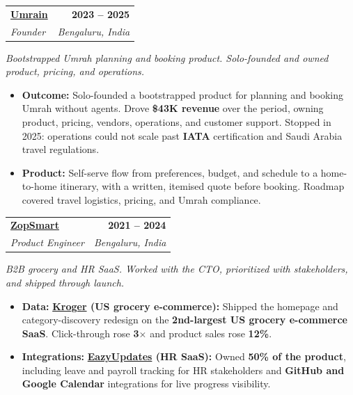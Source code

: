\documentclass[letterpaper,11pt]{article}
\makeatletter
\newcommand{\entry}[4]{%
  \begin{tabularx}{\linewidth}{@{}X@{}r@{}}
    \textbf{#1} & \textbf{#4} \\
    \textit{#2} & \textit{#3} \\
  \end{tabularx}%
  \vspace{1pt}
}
\makeatother
\begin{document}
\entry{\href{https://umrain.in}{Umrain}}{Founder}{Bengaluru, India}{2023 -- 2025}
{\small\textit{Bootstrapped Umrah planning and booking product. Solo-founded and owned product, pricing, and operations.}}
\begin{itemize}
  \item \textbf{Outcome:} Solo-founded a bootstrapped product for planning and booking Umrah without agents. Drove \textbf{\$43K revenue} over the period, owning product, pricing, vendors, operations, and customer support. Stopped in 2025: operations could not scale past \textbf{IATA} certification and Saudi Arabia travel regulations.
  \item \textbf{Product:} Self-serve flow from preferences, budget, and schedule to a home-to-home itinerary, with a written, itemised quote before booking. Roadmap covered travel logistics, pricing, and Umrah compliance.
\end{itemize}

\entry{\href{https://zopsmart.com}{ZopSmart}}{Product Engineer}{Bengaluru, India}{2021 -- 2024}
{\small\textit{B2B grocery and HR SaaS. Worked with the CTO, prioritized with stakeholders, and shipped through launch.}}
\begin{itemize}
  \item \textbf{Data:} \textbf{\href{https://www.kroger.com}{Kroger} (US grocery e-commerce):} Shipped the homepage and category-discovery redesign on the \textbf{2nd-largest US grocery e-commerce SaaS}. Click-through rose \textbf{3$\times$} and product sales rose \textbf{12\%}.
  \item \textbf{Integrations:} \textbf{\href{https://eazyupdates.com}{EazyUpdates} (HR SaaS):} Owned \textbf{50\% of the product}, including leave and payroll tracking for HR stakeholders and \textbf{GitHub and Google Calendar} integrations for live progress visibility.
\end{itemize}
\end{document}
